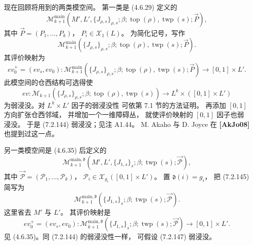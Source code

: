 现在回顾将用到的两类模空间。
第一类是 (4.6.29) 定义的
\[
\mathcal M_{k+1}^{\mathrm{main}}
(M',L',\{J_{\rho,s}\}_{\rho,s};
\beta;\operatorname{top}(\rho),
\operatorname{twp}(s);\vec P),
\]
其中 $\vec P=(P_1,\ldots,P_k)$，
$P_i\in\mathcal X_1(L)$。
为简化记号，写作
\begin{equation}
\mathcal M_{k+1}^{\mathrm{main}}
(\{J_{\rho,s}\}_{\rho,s};\beta;
\operatorname{top}(\rho),\operatorname{twp}(s);\vec P).
\tag{7.2.143}\label{eq:7-2-143}
\end{equation}
其评价映射为
\begin{equation}
ev_0^+=(ev_s,ev_0)\colon
\mathcal M_{k+1}^{\mathrm{main}}
(\{J_{\rho,s}\}_{\rho,s};\beta;
\operatorname{top}(\rho),\operatorname{twp}(s);\vec P)
\longrightarrow[0,1]\times L'.
\tag{7.2.144}\label{eq:7-2-144}
\end{equation}
此模空间的仓西结构可选得使
\[
ev\colon
\mathcal M_{k+1}(\{J_{\rho,s}\}_{\rho,s};
\beta;\operatorname{top}(\rho),\operatorname{twp}(s))
\longrightarrow L^k\times([0,1]\times L')
\]
为弱浸没。对 $L^k\times L'$ 因子的弱浸没性
可依第 7.1 节的方法证明。
再添加 $[0,1]$ 方向扩张仓西邻域，
并增加一个一维障碍丛，
就使评价映射的 $[0,1]$ 因子也弱浸没。
于是 (7.2.144) 弱浸没；见注 A1.44。
M. Akaho 与 D. Joyce 在 \textbf{[AkJo08]}
也提到过这一点。

另一类模空间是 (4.6.35) 后定义的
\begin{equation}
\mathcal M_{k+1}^{\mathrm{main},\mathfrak d}
(M',L',\{J_{1,s}\}_s;\beta;
\operatorname{twp}(s);\vec{\mathcal P}),
\tag{7.2.145}\label{eq:7-2-145}
\end{equation}
其中 $\vec{\mathcal P}=(\mathcal P_1,\ldots,
\mathcal P_k)$，
$\mathcal P_i\in\mathcal X_{g_i}([0,1]\times L')$。
置 $\mathfrak d(i)=g_i$，
把 (7.2.145) 简写为
\begin{equation}
\mathcal M_{k+1}^{\mathrm{main},\mathfrak d}
(\{J_{1,s}\}_s;\beta;
\operatorname{twp}(s);\vec{\mathcal P}).
\tag{7.2.146}\label{eq:7-2-146}
\end{equation}
这里省去 $M'$ 与 $L'$。
其评价映射是
\begin{equation}
ev_0^+=(ev_s,ev_0)\colon
\mathcal M_{k+1}^{\mathrm{main},\mathfrak d}
(\{J_{1,s}\}_s;\beta;
\operatorname{twp}(s);\vec{\mathcal P})
\longrightarrow[0,1]\times L'.
\tag{7.2.147}\label{eq:7-2-147}
\end{equation}
见 (4.6.35)。同 (7.2.144) 的弱浸没性一样，
可假设 (7.2.147) 弱浸没。

